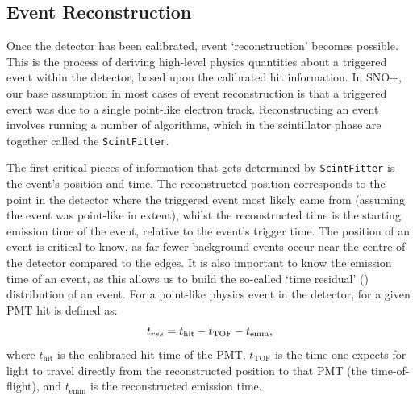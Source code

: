 \subsection{Event Reconstruction}\label{sec:ev_reco}
Once the detector has been calibrated, event `reconstruction' becomes possible. This is the process of deriving high-level physics quantities about a triggered event within the detector, based upon the calibrated hit information. In SNO+, our base assumption in most cases of event reconstruction is that a triggered event was due to a single point-like electron track. Reconstructing an event involves running a number of algorithms, which in the scintillator phase are together called the \texttt{ScintFitter}.

The first critical pieces of information that gets determined by \texttt{ScintFitter} is the event's position and time. The reconstructed position corresponds to the point in the detector where the triggered event most likely came from (assuming the event was point-like in extent), whilst the reconstructed time is the starting emission time of the event, relative to the event's trigger time. The position of an event is critical to know, as far fewer background events occur near the centre of the detector compared to the edges. It is also important to know the emission time of an event, as this allows us to build the so-called `time residual' (\tres{}) distribution of an event. For a point-like physics event in the detector, \tres{} for a given PMT hit is defined as:
\begin{equation}
    t_{res} = t_{\mathrm{hit}} - t_{\mathrm{TOF}} - t_{\mathrm{emm}},
\end{equation}
where $t_{\mathrm{hit}}$ is the calibrated hit time of the PMT, $t_{\mathrm{TOF}}$ is the time one expects for light to travel directly from the reconstructed position to that PMT (the time-of-flight), and $t_{\mathrm{emm}}$ is the reconstructed emission time.

